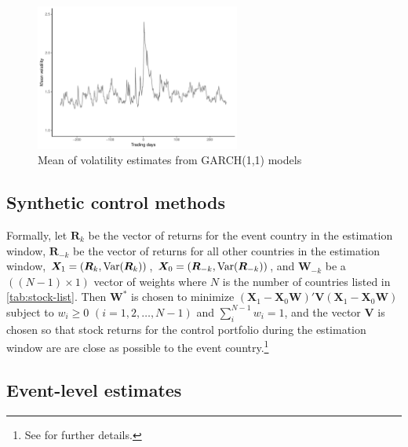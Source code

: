 \documentclass[12pt,final,fleqn]{article}
\theoremstyle{plain}
\newcommand\var{{\rm Var}}
\begin{document}
\begin{figure}[!htb]
\centering
\includegraphics[width = 0.6\textwidth]{../figs/mean-volatility.pdf}
\caption{Mean of volatility estimates from GARCH(1,1) models}
\label{fig:volatility}
\end{figure}


\subsection{Synthetic control methods} \label{subsec: synth}

Formally, let $\boldsymbol{R}_{k}$ be the vector of returns for the event country in the estimation window, $\boldsymbol{R}_{-k}$ be the vector of returns for all other countries in the estimation window, $\boldsymbol{X}_1=(\boldsymbol{R}_{k},\var(\boldsymbol{R}_{k}))$, $\boldsymbol{X}_0=(\boldsymbol{R}_{-k},\var(\boldsymbol{R}_{-k}))$, and $\boldsymbol{W}_{-k}$ be a $((N-1) \times 1)$ vector of weights where $N$ is the number of countries listed in \autoref{tab:stock-list}. Then $\boldsymbol{W}^*$ is chosen to minimize $(\boldsymbol{X}_1-\boldsymbol{X}_0\boldsymbol{W})'\boldsymbol{V}(\boldsymbol{X}_1-\boldsymbol{X}_0\boldsymbol{W})$ subject to $w_i\geq0$ $(i = 1,2,\ldots,N-1)$ and $\sum_i^{N-1} w_i = 1$, and the vector $\boldsymbol{V}$ is chosen so that stock returns for the control portfolio during the estimation window are are close as possible to the event country.\footnote{See \citet{abadie2003economic} for further details.} 




\subsection{Event-level estimates} \label{subsec: coups appendix}
\end{document}
